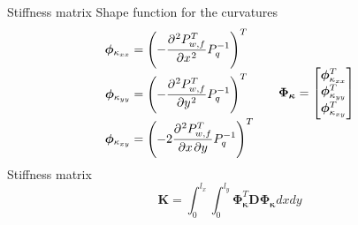 \documentclass{beamer}
\begin{document}
\begin{frame}{Stiffness matrix}
	Shape function for the curvatures 
	\begin{equation*}
	\begin{aligned}
	\bm\phi_{\kappa_{xx}} &= \left(-\diffp[2]{P_{w, f}^T}{x} P_q^{-1} \right)^T \\
	\bm\phi_{\kappa_{yy}} &= \left(-\diffp[2]{P_{w, f}^T}{y} P_q^{-1} \right)^T \\
	\bm\phi_{\kappa_{xy}} &= \left(-2 \diffp{P_{w, f}^T}{x,y} P_q^{-1} \right)^T \\
	\end{aligned} \qquad
	\bm\Phi_{\bm{\kappa}} = \begin{bmatrix}
	\bm\phi_{\kappa_{xx}}^T \vspace{1pt} \\
	\bm\phi_{\kappa_{yy}}^T \vspace{1pt} \\
	\bm\phi_{\kappa_{xy}}^T \vspace{1pt} \\
	\end{bmatrix}
	\end{equation*}
	Stiffness matrix
	\begin{equation*}
	\bm{K} = \int_{0}^{l_x} \int_{0}^{l_y}
	\bm\Phi_{\bm{\kappa}}^T \bm{D} \bm\Phi_{\bm{\kappa}}
	dx dy
	\end{equation*}
\end{frame}
\end{document}
